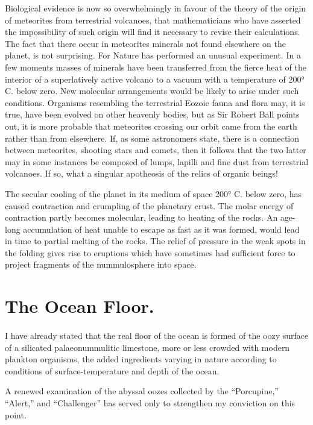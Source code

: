 \documentclass[a4paper, 12pt, oneside]{article}
\begin{document}
Biological evidence is now so overwhelmingly in favour of the theory of the origin of meteorites from terrestrial volcanoes, that mathematicians who have asserted the impossibility of such origin will find it necessary to revise their calculations. The fact that there occur in meteorites minerals not found elsewhere on the planet, is not surprising. For Nature has performed an unusual experiment. In a few moments masses of minerals have been transferred from the fierce heat of the interior of a superlatively active volcano to a vacuum with a temperature of 200° C. below zero. New molecular arrangements would be likely to arise under such conditions. Organisms resembling the terrestrial Eozoic fauna and flora may, it is true, have been evolved on other heavenly bodies, but as Sir Robert Ball points out, it is more probable that meteorites crossing our orbit came from the earth rather than from elsewhere. If, as some astronomers state, there is a connection between meteorites, shooting stars and comets, then it follows that the two latter may in some instances be composed of lumps, lapilli and fine dust from terrestrial volcanoes. If so, what a singular apotheosis of the relics of organic beings!

The secular cooling of the planet in its medium of space 200° C. below zero, has caused contraction and crumpling of the planetary crust. The molar energy of contraction partly becomes molecular, leading to heating of the rocks. An age-long accumulation of heat unable to escape as fast as it was formed, would lead in time to partial melting of the rocks. The relief of pressure in the weak spots in the folding gives rise to eruptions which have sometimes had sufficient force to project fragments of the nummulosphere into space.

\section{The Ocean Floor.}
\paragraph{}
I have already stated that the real floor of the ocean is formed of the oozy surface of a silicated palaeonummulitic limestone, more or less crowded with modern plankton organisms, the added ingredients varying in nature according to conditions of surface-temperature and depth of the ocean.

A renewed examination of the abyssal oozes collected by the ``Porcupine,'' ``Alert,'' and ``Challenger'' has served only to strengthen my conviction on this point.
\end{document}

